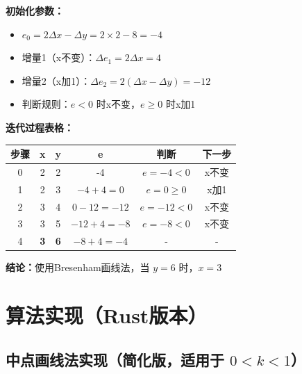 \documentclass[12pt,a4paper]{article}
\begin{document}
\begin{tcolorbox}
\textbf{初始化参数：}
\begin{itemize}
    \item $e_0 = 2\Delta x - \Delta y = 2 \times 2 - 8 = -4$
    \item 增量1（x不变）：$\Delta e_1 = 2\Delta x = 4$
    \item 增量2（x加1）：$\Delta e_2 = 2(\Delta x - \Delta y) = -12$
    \item 判断规则：$e < 0$ 时x不变，$e \geq 0$ 时x加1
\end{itemize}

\textbf{迭代过程表格：}

\begin{center}
\begin{tabular}{|c|c|c|c|c|c|}
\hline
\textbf{步骤} & \textbf{x} & \textbf{y} & \textbf{e} & \textbf{判断} & \textbf{下一步} \\
\hline
0 & 2 & 2 & -4 & $e=-4<0$ & x不变 \\
\hline
1 & 2 & 3 & $-4+4=0$ & $e=0 \geq 0$ & x加1 \\
\hline
2 & 3 & 4 & $0-12=-12$ & $e=-12<0$ & x不变 \\
\hline
3 & 3 & 5 & $-12+4=-8$ & $e=-8<0$ & x不变 \\
\hline
4 & \textbf{3} & \textbf{6} & $-8+4=-4$ & - & - \\
\hline
\end{tabular}
\end{center}

\textbf{结论：}使用Bresenham画线法，当 $y = 6$ 时，$\boxed{x = 3}$
\end{tcolorbox}

\section{算法实现（Rust版本）}

\subsection{中点画线法实现（简化版，适用于 $0 < k < 1$）}
\end{document}
